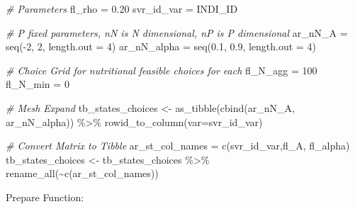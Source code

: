 \documentclass[
]{book}
\newenvironment{Shaded}{\begin{snugshade}}{\end{snugshade}}
\newcommand{\AttributeTok}[1]{\textcolor[rgb]{0.77,0.63,0.00}{#1}}
\newcommand{\CommentTok}[1]{\textcolor[rgb]{0.56,0.35,0.01}{\textit{#1}}}
\newcommand{\DecValTok}[1]{\textcolor[rgb]{0.00,0.00,0.81}{#1}}
\newcommand{\FloatTok}[1]{\textcolor[rgb]{0.00,0.00,0.81}{#1}}
\newcommand{\FunctionTok}[1]{\textcolor[rgb]{0.00,0.00,0.00}{#1}}
\newcommand{\NormalTok}[1]{#1}
\newcommand{\OtherTok}[1]{\textcolor[rgb]{0.56,0.35,0.01}{#1}}
\newcommand{\SpecialCharTok}[1]{\textcolor[rgb]{0.00,0.00,0.00}{#1}}
\newcommand{\StringTok}[1]{\textcolor[rgb]{0.31,0.60,0.02}{#1}}
\begin{document}
\begin{Shaded}
\begin{Highlighting}[]
\CommentTok{\# Parameters}
\NormalTok{fl\_rho }\OtherTok{=} \FloatTok{0.20}
\NormalTok{svr\_id\_var }\OtherTok{=} \StringTok{\textquotesingle{}INDI\_ID\textquotesingle{}}

\CommentTok{\# P fixed parameters, nN is N dimensional, nP is P dimensional}
\NormalTok{ar\_nN\_A }\OtherTok{=} \FunctionTok{seq}\NormalTok{(}\SpecialCharTok{{-}}\DecValTok{2}\NormalTok{, }\DecValTok{2}\NormalTok{, }\AttributeTok{length.out =} \DecValTok{4}\NormalTok{)}
\NormalTok{ar\_nN\_alpha }\OtherTok{=} \FunctionTok{seq}\NormalTok{(}\FloatTok{0.1}\NormalTok{, }\FloatTok{0.9}\NormalTok{, }\AttributeTok{length.out =} \DecValTok{4}\NormalTok{)}

\CommentTok{\# Choice Grid for nutritional feasible choices for each}
\NormalTok{fl\_N\_agg }\OtherTok{=} \DecValTok{100}
\NormalTok{fl\_N\_min }\OtherTok{=} \DecValTok{0}

\CommentTok{\# Mesh Expand}
\NormalTok{tb\_states\_choices }\OtherTok{\textless{}{-}} \FunctionTok{as\_tibble}\NormalTok{(}\FunctionTok{cbind}\NormalTok{(ar\_nN\_A, ar\_nN\_alpha)) }\SpecialCharTok{\%\textgreater{}\%} 
  \FunctionTok{rowid\_to\_column}\NormalTok{(}\AttributeTok{var=}\NormalTok{svr\_id\_var)}

\CommentTok{\# Convert Matrix to Tibble}
\NormalTok{ar\_st\_col\_names }\OtherTok{=} \FunctionTok{c}\NormalTok{(svr\_id\_var,}\StringTok{\textquotesingle{}fl\_A\textquotesingle{}}\NormalTok{, }\StringTok{\textquotesingle{}fl\_alpha\textquotesingle{}}\NormalTok{)}
\NormalTok{tb\_states\_choices }\OtherTok{\textless{}{-}}\NormalTok{ tb\_states\_choices }\SpecialCharTok{\%\textgreater{}\%} \FunctionTok{rename\_all}\NormalTok{(}\SpecialCharTok{\textasciitilde{}}\FunctionTok{c}\NormalTok{(ar\_st\_col\_names))}
\end{Highlighting}
\end{Shaded}

Prepare Function:
\end{document}
